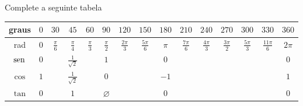 \begin{exo}
Complete a seguinte tabela
\begin{center}
\begin{tabular}{|c|c|c|c|c|c|c|c|c|c|c|c|c|c|c|}
\hline
graus & $0$ & $30$&$45$&$60$&$90$&$120$&$150$&$180$&$210$&$240$&$270$&$300$&$330$&$360$\\
\hline
 rad &$0$ &$\tfrac{\pi}{6}$
&$\tfrac{\pi}{4}$&$\tfrac{\pi}{3}$&$\tfrac{\pi}{2}$&$\tfrac{2\pi}{3}$&$\tfrac{5\pi}{6}
$&$\pi$&$\tfrac{7\pi}{6}$&$\tfrac{4\pi}{3}$&$\tfrac{3\pi}{2}$&$\tfrac{5\pi}{3}$&$\tfrac{
11\pi}{6}$&$2\pi$\\ \hline
$\operatorname{sen}$ &$0$ & &$\frac{{1}}{\sqrt{2}}$& &$1$&&&$0$&&&&&&$0$\\  \hline
$\cos$ &$1$ & &$\frac{{1}}{\sqrt{2}}$&&$0$&&&$-1$&&&&&&$1$\\ \hline
$\tan$ &$0$ & &$1$&& $\varnothing$ &&&$0$&&&&&&$0$\\
\hline
\end{tabular}
\end{center}
\end{exo}

